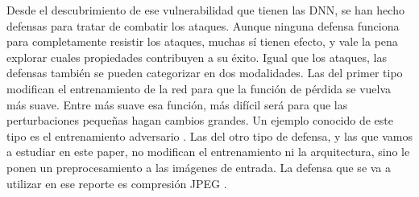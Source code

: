 Desde el descubrimiento de ese vulnerabilidad que tienen las DNN, se han hecho defensas para tratar de combatir los ataques. Aunque ninguna defensa funciona para completamente resistir los ataques, muchas sí tienen efecto, y vale la pena explorar cuales propiedades contribuyen a su éxito. Igual que los ataques, las defensas también se pueden categorizar en dos modalidades. Las del primer tipo modifican el entrenamiento de la red para que la función de pérdida se vuelva más suave. Entre más suave esa función, más difícil será para que las perturbaciones pequeñas hagan cambios grandes. Un ejemplo conocido de este tipo es el entrenamiento adversario \cite{goodfellow2015explaining, Shaham_2018, szegedy2014intriguing}. Las del otro tipo de defensa, y las que vamos a estudiar en este paper, no modifican el entrenamiento ni la arquitectura, sino le ponen un preprocesamiento a las imágenes de entrada. La defensa que se va a utilizar en ese reporte es compresión JPEG \cite{das2017keeping}.





